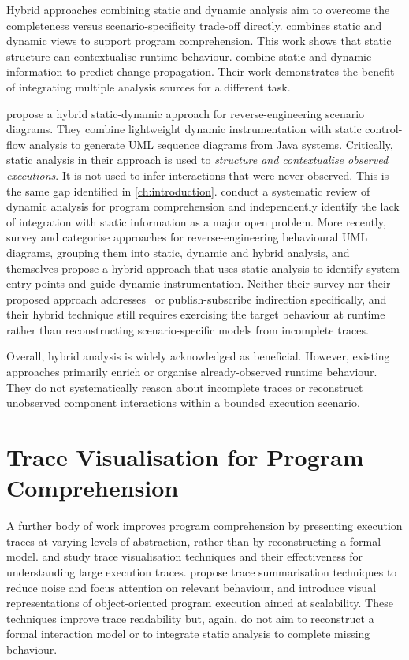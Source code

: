 Hybrid approaches combining static and dynamic analysis aim to overcome the
completeness versus scenario-specificity trade-off directly.
\textcite{systa:reverse} combines static and dynamic views to support program
comprehension. This work shows that static structure can contextualise runtime
behaviour.
\textcite{hassan:changeprop} combine static and dynamic information to predict
change propagation. Their work demonstrates the benefit of integrating multiple
analysis sources for a different task.

\textcite{labiche:hybrid} propose a hybrid static-dynamic approach for
reverse-engineering scenario diagrams. They combine lightweight dynamic
instrumentation with static control-flow analysis to generate UML sequence
diagrams from Java systems.
Critically, static analysis in their approach is used to \emph{structure and
contextualise observed executions}. It is not used to infer interactions that
were never observed. This is the same gap identified in \cref{ch:introduction}.
\textcite{cornelissen:systematic} conduct a systematic review of dynamic
analysis for program comprehension and independently identify the lack of
integration with static information as a major open problem.
More recently, \textcite{abdelmalek:survey} survey and categorise approaches
for reverse-engineering behavioural UML diagrams, grouping them into static,
dynamic and hybrid analysis, and themselves propose a hybrid approach that
uses static analysis to identify system entry points and guide dynamic
instrumentation. Neither their survey nor their proposed approach addresses
\Cpp\ or publish-subscribe indirection specifically, and their hybrid
technique still requires exercising the target behaviour at runtime rather
than reconstructing scenario-specific models from incomplete traces.

Overall, hybrid analysis is widely acknowledged as beneficial. However,
existing approaches primarily enrich or organise already-observed runtime
behaviour. They do not systematically reason about incomplete traces or
reconstruct unobserved component interactions within a bounded execution
scenario.

\section{Trace Visualisation for Program Comprehension}

A further body of work improves program comprehension by presenting execution
traces at varying levels of abstraction, rather than by reconstructing a
formal model.
\textcite{cornelissen:controlled} and \textcite{cornelissen:systematic} study
trace visualisation techniques and their effectiveness for understanding
large execution traces.
\textcite{hamou-lhadj:tracesummary} propose trace summarisation techniques to
reduce noise and focus attention on relevant behaviour, and
\textcite{depauw:execpatterns} introduce visual representations of
object-oriented program execution aimed at scalability.
These techniques improve trace readability but, again, do not aim to
reconstruct a formal interaction model or to integrate static analysis to
complete missing behaviour.

